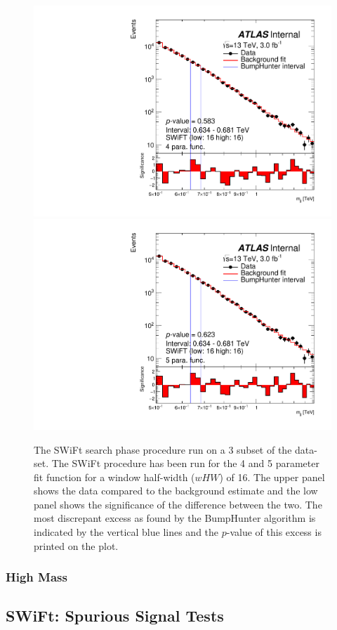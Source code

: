 \begin{figure}[!htb]
\captionsetup[subfigure]{aboveskip=0pt,justification=centering}
\centering
{} {
  \includegraphics[width=0.45\linewidth, angle=0]{figs/Dibjet/LowMass/FitStudy/bhFit_subset_4para_low16_high16.pdf}
}
 {
  \includegraphics[width=0.45\linewidth, angle=0]{figs/Dibjet/LowMass/FitStudy/bhFit_subset_5para_low16_high16.pdf}
}
\vspace{10pt}
\caption{\label{fig:bhFit_lm_subset}
  The SWiFt search phase procedure run on a 3 \ifb{} subset of the \lm{} data-set.
  The SWiFt procedure has been run for the 4 and 5 parameter fit function for a window half-width ($wHW$) of 16.
  The upper panel shows the data compared to the background estimate and the low panel shows the significance of the difference between the two.
  The most discrepant excess as found by the {\sc BumpHunter} algorithm is indicated by the vertical blue lines and the \mbox{$p$-value} of this excess is printed on the plot. }
\end{figure}

\subsubsection{High Mass}
\label{sec:highmass_windowSelTests} 

\subsection{SWiFt: Spurious Signal Tests}
\label{sec:spuriousSignal}

